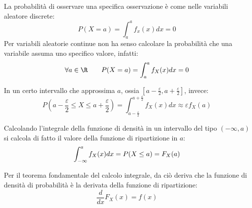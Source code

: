 \begin{defin}
La probabilità di osservare una specifica osservazione è come nelle variabili aleatore discrete:
\begin{equation*}
	P(X = a) = \int_{a}^ {a} f_x (x) dx = 0
\end{equation*}
Per variabili aleatorie continue non ha senso calcolare la probabilità che una variabile assuma uno specifico valore, infatti:
\begin{equation*}
	\forall a\in\R \qquad P(X=a)=\int_a^a f_X(x)dx=0
\end{equation*}

In un certo intervallo che approssima $a$, ossia $[a-\frac{\varepsilon}{2},a+\frac{\varepsilon}{2}]$, invece:
\begin{equation*}
	P\left(a - \frac{\varepsilon}{2}\leq X\leq a + \frac{\varepsilon}{2}\right) = \int_{a - \frac{\varepsilon}{2}}^{a + \frac{\varepsilon}{2}} f_X(x)dx \approx \varepsilon f_X(a)
\end{equation*}

Calcolando l'integrale della funzione di densità in un intervallo del tipo $(-\infty,a)$ si calcola di fatto il valore della funzione di ripartizione in $a$:
\begin{equation*}
	\int_{-\infty}^a f_X(x)dx = P(X\leq a) = F_X(a) \\
\end{equation*}



Per il teorema fondamentale del calcolo integrale, da ciò deriva che la funzione di densità di probabilità è la derivata della funzione di ripartizione:
\begin{equation*}
	\frac{d}{dx}F_X(x)=f(x)
\end{equation*}
\end{defin}



